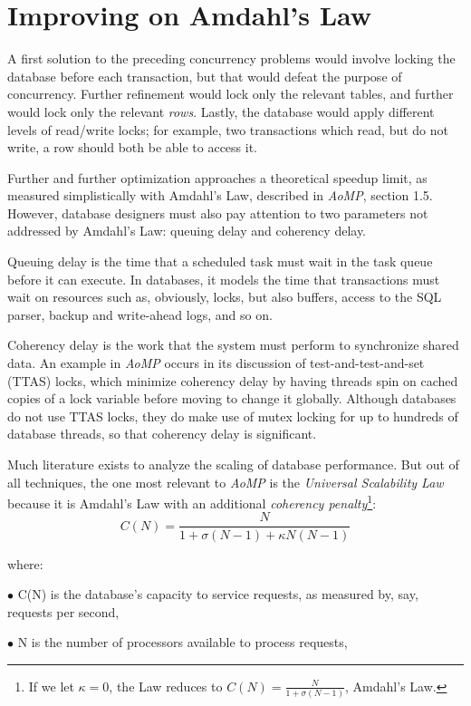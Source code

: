 \documentclass[12pt]{article} %
\begin{document}
\section{Improving on Amdahl's Law}
A first solution to the preceding concurrency problems would involve locking the database before each transaction, but that would defeat the purpose of concurrency. Further refinement would lock only the relevant tables, and further would lock only the relevant \textsl{rows}. Lastly, the database would apply different levels of read/write locks; for example, two transactions which read, but do not write, a row should both be able to access it.

Further and further optimization approaches a theoretical speedup limit, as measured simplistically with Amdahl's Law, described in \textsl{AoMP}, section 1.5. However, database designers must also pay attention to two parameters not addressed by Amdahl's Law: queuing delay and coherency delay.

Queuing delay is the time that a scheduled task must wait in the task queue before it can execute. In databases, it models the time that transactions must wait on resources such as, obviously, locks, but also buffers, access to the SQL parser, backup and write-ahead logs, and so on.

Coherency delay is the work that the system must perform to synchronize shared data. An example in \textsl{AoMP} occurs in its discussion of test-and-test-and-set (TTAS) locks, which minimize coherency delay by having threads spin on cached copies of a lock variable before moving to change it globally. Although databases do not use TTAS locks, they do make use of mutex locking for up to hundreds of database threads, so that coherency delay is significant.

Much literature exists to analyze the scaling of database performance. But out of all techniques, the one most relevant to \textsl{AoMP} is the \textsl{Universal Scalability Law} because it is Amdahl's Law with an additional \textsl{coherency penalty}\footnote{If we let $\kappa = 0$, the Law reduces to $C(N)=\frac{N}{1 +\sigma(N-1)}$, Amdahl's Law.}: 
\[C(N) = \frac{N}{1+\sigma (N-1)+\kappa N(N-1)}\]

where:

$\bullet$ C(N) is the database's capacity to service requests, as measured by, say, requests per second,

$\bullet$ N is the number of processors available to process requests, 
\end{document}
